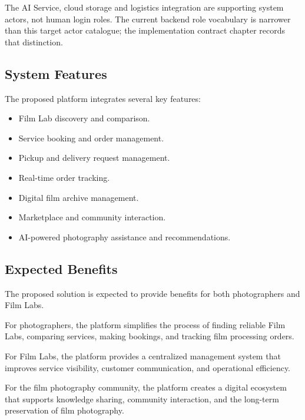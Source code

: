 The AI Service, cloud storage and logistics integration are supporting system
actors, not human login roles. The current backend role vocabulary is narrower
than this target actor catalogue; the implementation contract chapter records
that distinction.

\subsection{System Features}

The proposed platform integrates several key features:

\begin{itemize}
    \item Film Lab discovery and comparison.
    \item Service booking and order management.
    \item Pickup and delivery request management.
    \item Real-time order tracking.
    \item Digital film archive management.
    \item Marketplace and community interaction.
    \item AI-powered photography assistance and recommendations.
\end{itemize}

\subsection{Expected Benefits}

The proposed solution is expected to provide benefits for both photographers and Film Labs.

For photographers, the platform simplifies the process of finding reliable Film Labs, comparing services, making bookings, and tracking film processing orders.

For Film Labs, the platform provides a centralized management system that improves service visibility, customer communication, and operational efficiency.

For the film photography community, the platform creates a digital ecosystem that supports knowledge sharing, community interaction, and the long-term preservation of film photography.
